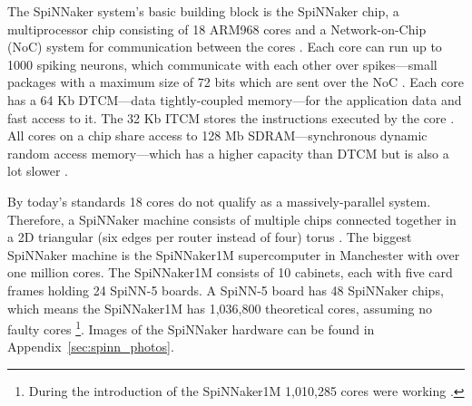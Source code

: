 \documentclass[]{article}
\begin{document}
The SpiNNaker system's basic building block is the SpiNNaker chip,
a multiprocessor chip consisting of 18 ARM968 cores
\citep{furber_et_al_2020} and a
Network-on-Chip (NoC) system for communication between the cores
\citep{furber_et_al_2007}.
Each core can run up to 1000 spiking neurons, which communicate with
each other over spikes---small packages with a maximum size of 72 bits
which are sent over the NoC \citep{furber_et_al_2007, spinnaker_2020}.
Each core has a 64 Kb DTCM---data tightly-coupled memory---for the
application data and fast access to it.
The 32 Kb ITCM stores the instructions executed by the core
\citep{furber_et_al_2020}.
All cores on a chip share access to 128 Mb SDRAM---synchronous
dynamic random access memory---which has a higher capacity than
DTCM but is also a lot slower
\citep{furber_et_al_2020, spinnaker_2020a}.

By today's standards 18 cores do not qualify as a massively-parallel
system.
Therefore, a SpiNNaker machine consists of multiple chips connected
together in a 2D triangular (six edges per router instead of four)
torus \citep{furber_et_al_2020}.
The biggest SpiNNaker machine is the SpiNNaker1M supercomputer in
Manchester with over one million cores.
The SpiNNaker1M consists of 10 cabinets, each with five card frames
holding 24 SpiNN-5 boards.
A SpiNN-5 board has 48 SpiNNaker chips, which means the SpiNNaker1M
has 1,036,800 theoretical cores, assuming no faulty cores
\citep{furber_et_al_2020}\footnote{During the introduction of the
  SpiNNaker1M 1,010,285 cores were working \citep{uoecompsci_2019}.}.
Images of the SpiNNaker hardware can be found in
Appendix~\ref{sec:spinn_photos}.
\end{document}
